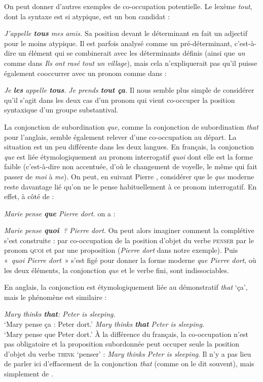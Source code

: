 {    On peut donner d’autres exemples de co-occupation potentielle. Le lexème \textit{tout}, dont la syntaxe est si atypique, est un bon candidat :
    
    \ea
    \textit{{J’appelle \textbf{tous} mes amis.}}
    \z
    Sa position devant le déterminant en fait un adjectif pour le moins atypique. Il est parfois analysé comme un pré-déterminant, c’est-à-dire un élément qui se combinerait avec les déterminants définis (ainsi que \textit{un} comme dans \textit{Ils ont rasé tout un village}), mais cela n’expliquerait pas qu’il puisse également cooccurrer avec un pronom comme dans :

\ea
\ea\textit{{Je \textbf{les} appelle \textbf{tous}.}}
\ex\textit{Je prends \textbf{tout ça}.}
\z
    \z
    Il nous semble plus simple de considérer qu’il s’agit dans les deux cas d’un pronom qui vient co-occuper la position syntaxique d’un groupe substantival.

    La conjonction de subordination \textit{que}, comme la conjonction de subordination \textit{that} pour l’anglais, semble également relever d’une co-occupation au départ. La situation est un peu différente dans les deux langues. En français, la conjonction \textit{que} est liée étymologiquement au pronom interrogatif \textit{quoi} dont elle est la forme faible (c’est-à-dire non accentuée, d’où le changement de voyelle, le même qui fait passer de \textit{moi} à \textit{me}). On peut, en suivant Pierre \citet{legoffic1993grammaire}, considérer que le \textit{que} moderne reste davantage lié qu’on ne le pense habituellement à ce pronom interrogatif. En effet, à côté de :

    \ea
    \textit{{Marie pense} \textbf{{que}}  {Pierre dort.}}
    \z
    on a :

    \ea
    \textit{{Marie pense} \textbf{{quoi~}}?  {Pierre dort.}}
    \z
    On peut alors imaginer comment la complétive s’est construite : par co-occupation de la position d’objet du verbe \textsc{penser} par le pronom \textsc{quoi} et par une proposition (\textit{Pierre dort} dans notre exemple). Puis «~\textit{quoi Pierre dort}~» s’est figé pour donner la forme moderne \textit{que Pierre dort}, où les deux éléments, la conjonction \textit{que} et le verbe fini, sont indissociables. 
    
    En anglais, la conjonction est étymologiquement liée au démonstratif \textit{that} ‘ça’, mais le phénomène est similaire :
    
    \ea
    \ea \textit{{Mary thinks} \textbf{{that}}{:}  {Peter is sleeping.} }\\   ‘Mary pense ça : Peter dort.’
    \ex\textit{{Mary thinks} \textbf{{that}}  {Peter is sleeping}.}\\    ‘Mary pense que Peter dort.’
    \z\z
    À la différence du français, la co-occupation n’est pas obligatoire et la proposition subordonnée peut occuper seule la position d’objet du verbe \textsc{think} ‘penser’ : \textit{Mary thinks Peter is sleeping}. Il n’y a pas lieu de parler ici d’effacement de la conjonction \textit{that} (comme on le dit souvent), mais simplement de .

}
